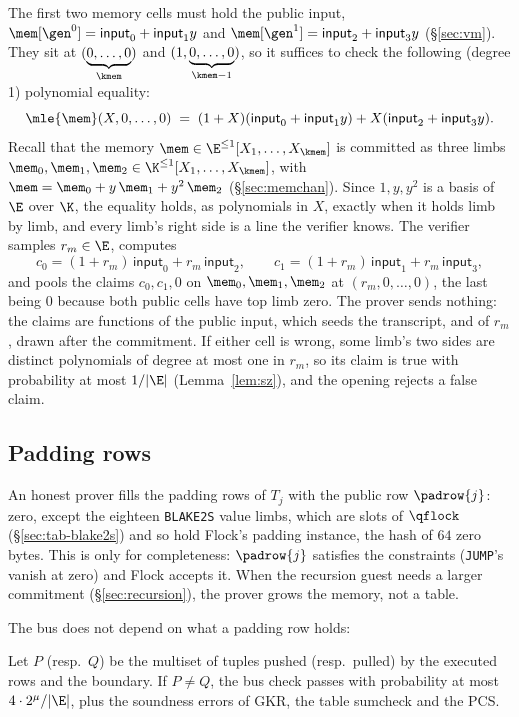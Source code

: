 The first two memory cells must hold the public input, $\mem[\gen^{0}]=\textsf{input}_0+\textsf{input}_1y$ and $\mem[\gen^{1}]=\textsf{input}_2+\textsf{input}_3y$ (\S\ref{sec:vm}). They sit at $(\underbrace{0,\dots,0}_{\kmem})$ and $(1,\underbrace{0,\dots,0}_{\kmem-1})$, so it suffices to check the following (degree 1) polynomial equality:
\[
  \mle{\mem}(X,0,\dots,0)\;=\;(1+X)(\textsf{input}_0+\textsf{input}_1y)+X(\textsf{input}_2+\textsf{input}_3y).
\]
Recall that the memory $\mem\in\E^{\le1}[X_1,\dots,X_{\kmem}]$ is committed as three limbs $\mem_0,\mem_1,\mem_2\in\K^{\le1}[X_1,\dots,X_{\kmem}]$, with $\mem=\mem_0+y\,\mem_1+y^2\,\mem_2$ (\S\ref{sec:memchan}). Since $1,y,y^2$ is a basis of $\E$ over $\K$, the equality holds, as polynomials in $X$, exactly when it holds limb by limb, and every limb's right side is a line the verifier knows. The verifier samples $r_m\in\E$, computes
\[
  c_0=(1+r_m)\,\textsf{input}_0+r_m\,\textsf{input}_2,\qquad c_1=(1+r_m)\,\textsf{input}_1+r_m\,\textsf{input}_3,
\]
and pools the claims $c_0,c_1,0$ on $\mem_0,\mem_1,\mem_2$ at $(r_m,0,\dots,0)$, the last being $0$ because both public cells have top limb zero. The prover sends nothing: the claims are functions of the public input, which seeds the transcript, and of $r_m$, drawn after the commitment. If either cell is wrong, some limb's two sides are distinct polynomials of degree at most one in $r_m$, so its claim is true with probability at most $1/|\E|$ (Lemma~\ref{lem:sz}), and the opening rejects a false claim.

\subsection{Padding rows}\label{sec:e2e-pad}

An honest prover fills the padding rows of $T_j$ with the public row $\padrow{j}$: zero, except the eighteen \texttt{BLAKE2S} value limbs, which are slots of $\qflock$ (\S\ref{sec:tab-blake2s}) and so hold Flock's padding instance, the hash of $64$ zero bytes. This is only for completeness: $\padrow{j}$ satisfies the constraints (\texttt{JUMP}'s vanish at zero) and Flock accepts it. When the recursion guest needs a larger commitment (\S\ref{sec:recursion}), the prover grows the memory, not a table.

The bus does not depend on what a padding row holds:

\begin{proposition}\label{prop:pad}
Let $P$ (resp.\ $Q$) be the multiset of tuples pushed (resp.\ pulled) by the executed rows and the boundary. If $P\neq Q$, the bus check passes with probability at most $4\cdot2^{\mu}/|\E|$, plus the soundness errors of GKR, the table sumcheck and the PCS.
\end{proposition}

